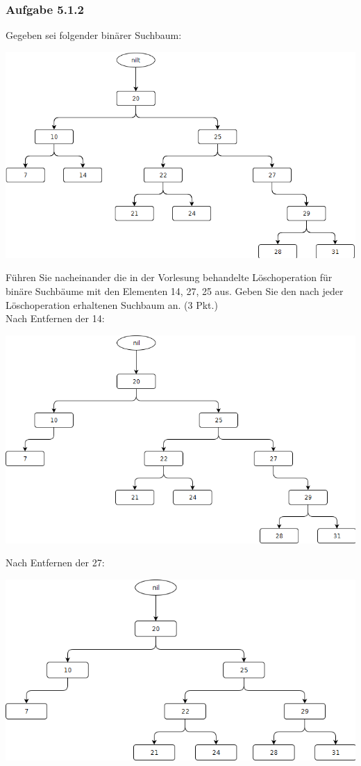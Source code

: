 \documentclass{article}
\begin{document}
\subsubsection*{Aufgabe 5.1.2}
\label{sssec:5.1.2}
Gegeben sei folgender binärer Suchbaum:
\begin{center}
	\includegraphics[scale=0.5]{w5-ressourcen/5-1-2-0.png}
\end{center}
Führen Sie nacheinander die in der Vorlesung behandelte Löschoperation für binäre Suchbäume mit den Elementen 14, 27, 25 aus.
Geben Sie den nach jeder Löschoperation erhaltenen Suchbaum an. (3 Pkt.)
\vspace{1cm}\-\\
Nach Entfernen der 14:\\
\begin{center}
	\includegraphics[scale=0.5]{w5-ressourcen/5-1-2-1.png}
\end{center}
Nach Entfernen der 27:\\
\begin{center}
	\includegraphics[scale=0.5]{w5-ressourcen/5-1-2-2.png}
\end{center}
\end{document}
